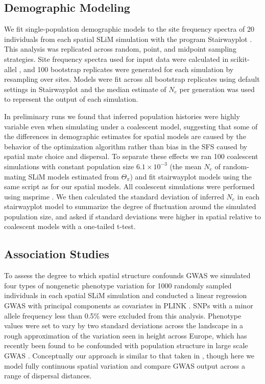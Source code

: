 \documentclass[11pt,twoside,lineno]{preprint}
\newif\ifcomments
\newcommand{\plr}[1]{\ifcomments{{\color{purple} \it (#1)}}\else{}\fi}
\begin{document}
\subsection{Demographic Modeling}

We fit single-population demographic models to the site frequency spectra of 20 individuals from each spatial SLiM simulation with the program Stairwayplot \citep{Liu2015}. This analysis was replicated across random, point, and midpoint sampling strategies. Site frequency spectra used for input data were calculated in scikit-allel \citep{Miles2017}, 
and 100 bootstrap replicates were generated for each simulation by resampling over sites. 
\plr{what were bootstrap replicates used for? if anything, need to say more precisely what you mean here}
Models were fit across all bootstrap replicates using default settings in Stairwayplot and the median estimate of $N_e$ per generation was used to represent the output of each simulation.

In preliminary runs we found that inferred population histories were highly variable even when simulating under a coalescent model, suggesting that some of the differences in demographic estimates for spatial models are caused by the behavior of the optimization algorithm rather than bias in the SFS caused by spatial mate choice and dispersal. To separate these effects we ran 100 coalescent simulations with constant population size $6.1\times 10^{-3}$ (the mean $N_{e}$ of random-mating SLiM models estimated from $\Theta_{\pi}$) and fit stairwayplot models using the same script as for our spatial models. All coalescent simulations were performed using msprime \citep{Kelleher2016}. We then calculated the standard deviation of inferred $N_{e}$ in each stairwayplot model to summarize the degree of fluctuation around the simulated population size, and asked if standard deviations were higher in spatial relative to coalescent models with a one-tailed t-test.

\subsection{Association Studies}

To assess the degree to which spatial structure confounds GWAS we simulated four types of nongenetic phenotype variation for 1000 randomly sampled individuals in each spatial SLiM simulation and conducted a linear regression GWAS with principal components as covariates in PLINK \citep{PURCELL2007}. SNPs with a minor allele frequency less than 0.5\% were excluded from this analysis. Phenotype values were set to vary by two standard deviations across the landscape in a rough approximation of the variation seen in height across Europe, which has recently been found to be confounded with population structure in large scale GWAS \citep{Berg2018,Sohail2018}. Conceptually our approach is similar to that taken in \citep{Mathieson2012}, though here we model fully continuous spatial variation and compare GWAS output across a range of dispersal distances. 
\end{document}
